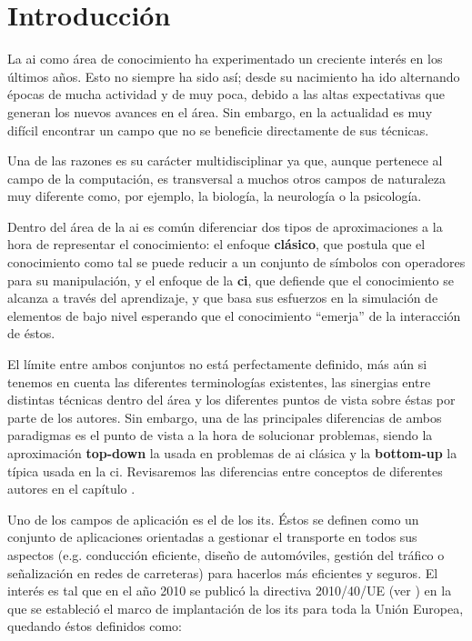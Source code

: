 \chapter{Introducción}
\label{ch:intro}

La \ac{ai} como área de conocimiento ha experimentado un creciente interés en los últimos años. Esto no siempre ha sido así; desde su nacimiento ha ido alternando épocas de mucha actividad y de muy poca, debido a las altas expectativas que generan los nuevos avances en el área. Sin embargo, en la actualidad es muy difícil encontrar un campo que no se beneficie directamente de sus técnicas.

Una de las razones es su carácter multidisciplinar ya que, aunque pertenece al campo de la computación, es transversal a muchos otros campos de naturaleza muy diferente como, por ejemplo, la biología, la neurología o la psicología.

Dentro del área de la \ac{ai} es común diferenciar dos tipos de aproximaciones a la hora de representar el conocimiento: el enfoque \textbf{clásico}, que postula que el conocimiento como tal se puede reducir a un conjunto de símbolos con operadores para su manipulación, y el enfoque de la \textbf{\gls{ci}}, que defiende que el conocimiento se alcanza a través del aprendizaje, y que basa sus esfuerzos en la simulación de elementos de bajo nivel esperando que el conocimiento \enquote{emerja} de la interacción de éstos.

El límite entre ambos conjuntos no está perfectamente definido, más aún si tenemos en cuenta las diferentes terminologías existentes, las sinergias entre distintas técnicas dentro del área y los diferentes puntos de vista sobre éstas por parte de los autores. Sin embargo, una de las principales diferencias de ambos paradigmas es el punto de vista a la hora de solucionar problemas, siendo la aproximación \textbf{top-down} la usada en problemas de \acrshort{ai} clásica y la \textbf{bottom-up} la típica usada en la \acrshort{ci}. Revisaremos las diferencias entre conceptos de diferentes autores en el capítulo .

Uno de los campos de aplicación es el de los \gls{its}. Éstos se definen como un conjunto de aplicaciones orientadas a gestionar el transporte en todos sus aspectos (e.g. conducción eficiente, diseño de automóviles, gestión del tráfico o señalización en redes de carreteras) para hacerlos más eficientes y seguros. El interés es tal que en el año 2010 se publicó la directiva 2010/40/UE (ver \cite{parliament2010directive}) en la que se estableció el marco de implantación de los \ac{its} para toda la Unión Europea, quedando éstos definidos como:

